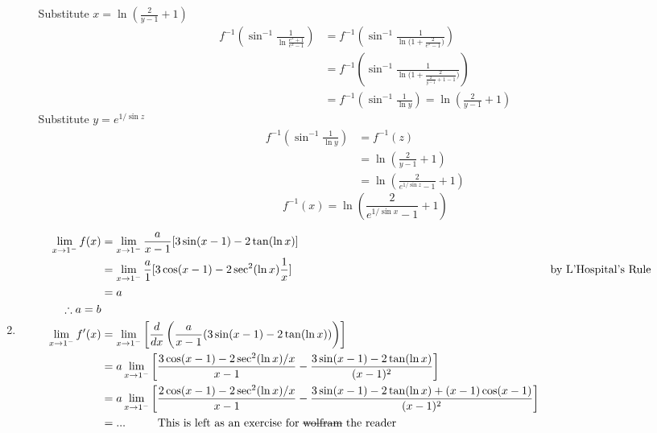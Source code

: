 \documentclass[12pt]{article}
\theoremstyle{definition}
\begin{document}
\begin{enumerate}
\begin{enumerate}
\begin{equation*}
                \end{equation*}
                Substitute $x=\ln(\frac{2}{y-1}+1)$
                \begin{align*}
                  f^{-1}(\sin^{-1}\frac{1}{\ln{\frac{e^x+1}{e^x-1}}})
                    & =f^{-1}(\sin^{-1}\frac{1}{\ln{(1+\frac{2}{e^x-1}})})             \\
                    & =f^{-1}(\sin^{-1}\frac{1}{\ln{(1+\frac{2}{\frac{2}{y-1}+1-1}})}) \\
                    & =f^{-1}(\sin^{-1}\frac{1}{\ln y}) = \ln(\frac{2}{y-1}+1)
                \end{align*}
                Substitute $y=e^{1/\sin{z}}$
                \begin{align*}
                  f^{-1}(\sin^{-1}\frac{1}{\ln y})
                    & =f^{-1}(z)                        \\
                    & =\ln(\frac{2}{y-1}+1)             \\
                    & =\ln(\frac{2}{e^{1/\sin{z}}-1}+1)
                \end{align*}
                \begin{equation*}
                  f^{-1}(x)=\ln(\frac{2}{e^{1/\sin{x}}-1}+1)
                \end{equation*}
        \end{enumerate}
  \item
        \begin{align*}
          \lim_{x\to 1^{-}} f(x) &= \lim_{x\to 1^{-}} \frac{a}{x-1}[3\sin(x-1)-2\tan(\ln x)]\\
            & =\lim_{x\to 1^{-}} \frac{a}{1}[3\cos(x-1)-2\sec^2(\ln x)\frac{1}{x}] &   & \text{by L'Hospital's Rule} \\
          &=a\\
          \therefore a=b \\
          \lim_{x\to 1^{-}} f'(x) &= \lim_{x\to 1^{-}} \left[\frac{d}{dx}\left(\frac{a}{x-1}(3\sin(x-1)-2\tan(\ln x)) \right)\right] \\
          &= a \lim_{x\to 1^{-}} \left[\frac{3\cos(x-1)-2\sec^2(\ln x)/x}{x-1} - \frac{3\sin(x-1) - 2\tan(\ln x)}{(x-1)^2} \right] \\
          &= a \lim_{x\to 1^{-}} \left[\frac{2\cos(x-1)-2\sec^2(\ln x)/x}{x-1} - \frac{3\sin(x-1) - 2\tan(\ln x)+(x-1)\cos(x-1)}{(x-1)^2} \right] \\
          &= ... \hspace{1cm} \text{This is left as an exercise for \sout{wolfram} the reader} \\

\end{align*}
\end{enumerate}
\end{document}
